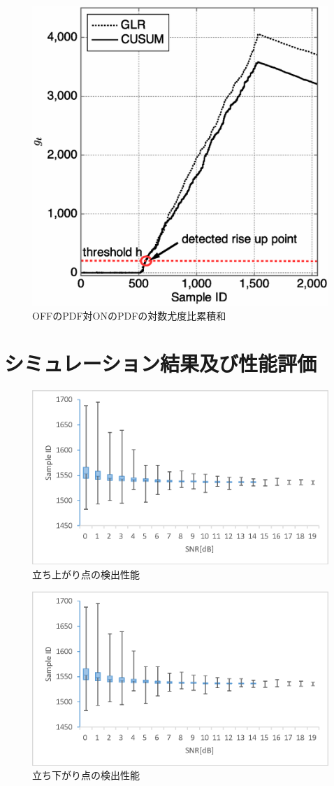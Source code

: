 \documentclass[technicalreport]{ieicej}
\begin{document}
\begin{figure}[t]
\centering
\includegraphics[width=0.8\hsize,clip]{OFF2ON.eps}
\caption{OFFのPDF対ONのPDFの対数尤度比累積和}
\label{sum_down}
\end{figure}


\section{シミュレーション結果及び性能評価}
\label{sec:result}


\begin{figure}[t]
\centering
\includegraphics[width=0.8\hsize,clip]{transition_up.eps}
\caption{立ち上がり点の検出性能}
\label{transition_up}
\end{figure}

\begin{figure}[t]
\centering
\includegraphics[width=0.8\hsize,clip]{transition_down.eps}
\caption{立ち下がり点の検出性能}
\label{transition_down}
\end{figure}
\end{document}
